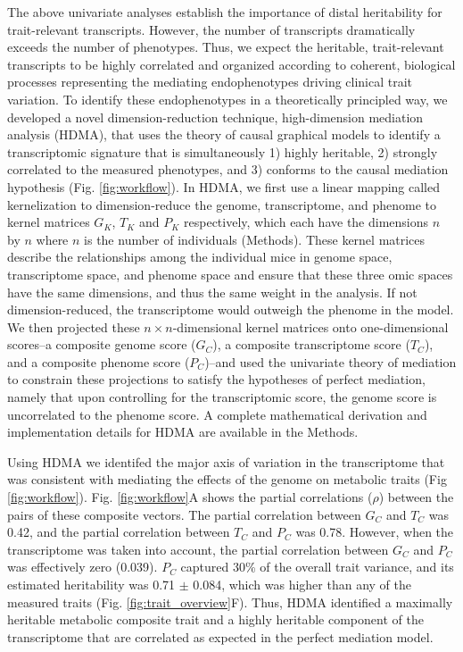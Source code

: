 \documentclass[
]{article}
\begin{document}
The above univariate analyses establish the importance of distal
heritability for trait-relevant transcripts. However, the number of
transcripts dramatically exceeds the number of phenotypes. Thus, we
expect the heritable, trait-relevant transcripts to be highly correlated
and organized according to coherent, biological processes representing
the mediating endophenotypes driving clinical trait variation. To
identify these endophenotypes in a theoretically principled way, we
developed a novel dimension-reduction technique, high-dimension
mediation analysis (HDMA), that uses the theory of causal graphical
models to identify a transcriptomic signature that is simultaneously 1)
highly heritable, 2) strongly correlated to the measured phenotypes, and
3) conforms to the causal mediation hypothesis (Fig.
\ref{fig:workflow}). In HDMA, we first use a linear mapping called
kernelization to dimension-reduce the genome, transcriptome, and phenome
to kernel matrices \(G_K\), \(T_K\) and \(P_K\) respectively, which each
have the dimensions \(n\) by \(n\) where \(n\) is the number of
individuals (Methods). These kernel matrices describe the relationships
among the individual mice in genome space, transcriptome space, and
phenome space and ensure that these three omic spaces have the same
dimensions, and thus the same weight in the analysis. If not
dimension-reduced, the transcriptome would outweigh the phenome in the
model. We then projected these \(n \times n\)-dimensional kernel
matrices onto one-dimensional scores--a composite genome score
(\(G_C\)), a composite transcriptome score (\(T_C\)), and a composite
phenome score (\(P_C\))--and used the univariate theory of mediation to
constrain these projections to satisfy the hypotheses of perfect
mediation, namely that upon controlling for the transcriptomic score,
the genome score is uncorrelated to the phenome score. A complete
mathematical derivation and implementation details for HDMA are
available in the Methods.

Using HDMA we identifed the major axis of variation in the transcriptome
that was consistent with mediating the effects of the genome on
metabolic traits (Fig \ref{fig:workflow}). Fig. \ref{fig:workflow}A
shows the partial correlations (\(\rho\)) between the pairs of these
composite vectors. The partial correlation between \(G_C\) and \(T_C\)
was 0.42, and the partial correlation between \(T_C\) and \(P_C\) was
0.78. However, when the transcriptome was taken into account, the
partial correlation between \(G_C\) and \(P_C\) was effectively zero
(0.039). \(P_C\) captured 30\% of the overall trait variance, and its
estimated heritability was 0.71 \(\pm\) 0.084, which was higher than any
of the measured traits (Fig. \ref{fig:trait_overview}F). Thus, HDMA
identified a maximally heritable metabolic composite trait and a highly
heritable component of the transcriptome that are correlated as expected
in the perfect mediation model.
\end{document}
